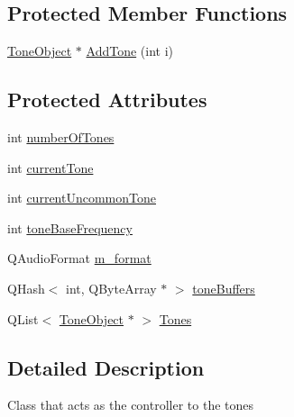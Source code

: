 \subsection*{Protected Member Functions}
\begin{DoxyCompactItemize}
\item 
\hyperlink{struct_tone_object}{Tone\-Object} $\ast$ \hyperlink{class_tone_manager_a5145a5a45c5b673c0301550285a04b61}{Add\-Tone} (int i)
\end{DoxyCompactItemize}
\subsection*{Protected Attributes}
\begin{DoxyCompactItemize}
\item 
int \hyperlink{class_tone_manager_ab5c9a0920466d82f885472f6b00d8874}{number\-Of\-Tones}
\item 
int \hyperlink{class_tone_manager_af00d6b668bdb26c6f2945495f6ef65c5}{current\-Tone}
\item 
int \hyperlink{class_tone_manager_a1a3f2a72be83f2e28766f72bc5b10222}{current\-Uncommon\-Tone}
\item 
int \hyperlink{class_tone_manager_a13b80ecf3d51ae30210fbe99c5bb2863}{tone\-Base\-Frequency}
\item 
Q\-Audio\-Format \hyperlink{class_tone_manager_ac3ffa52adeeacd270c60845052acf277}{m\-\_\-format}
\item 
Q\-Hash$<$ int, Q\-Byte\-Array $\ast$ $>$ \hyperlink{class_tone_manager_a7f2598af2eb46a6a9ee99bad59aa6db8}{tone\-Buffers}
\item 
Q\-List$<$ \hyperlink{struct_tone_object}{Tone\-Object} $\ast$ $>$ \hyperlink{class_tone_manager_a237856f80ab73ae89e32f59f6962ed41}{Tones}
\end{DoxyCompactItemize}


\subsection{Detailed Description}
Class that acts as the controller to the tones 

